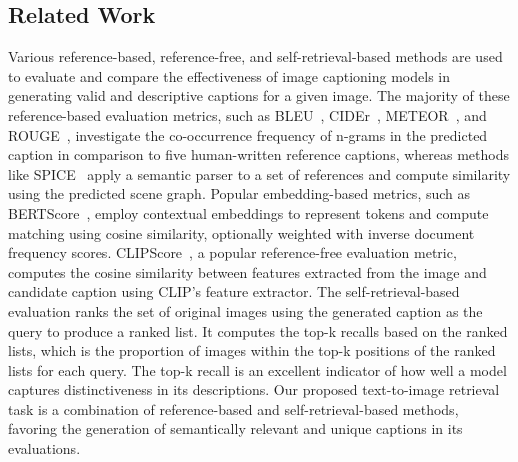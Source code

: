 \subsection{Related Work}
Various reference-based, reference-free, and self-retrieval-based methods are used to evaluate and compare the effectiveness of image captioning models in generating valid and descriptive captions for a given image. The majority of these reference-based evaluation metrics, such as BLEU~\cite{bleu}, CIDEr~\cite{CIDEr}, METEOR~\cite{METEOR}, and ROUGE~\cite{ROUGE}, investigate the co-occurrence frequency of n-grams in the predicted caption in comparison to five human-written reference captions, whereas methods like SPICE~\cite{Anderson2016SPICESP} apply a semantic parser to a set of references and compute similarity using the predicted scene graph. Popular embedding-based metrics, such as BERTScore~\cite{BERTScore}, employ contextual embeddings to represent tokens and compute matching using cosine similarity, optionally weighted with inverse document frequency scores. CLIPScore~\cite{CLIPScore}, a popular reference-free evaluation metric, computes the cosine similarity between features extracted from the image and candidate caption using CLIP's feature extractor. The self-retrieval-based evaluation ranks the set of original images using the generated caption as the query to produce a ranked list. It computes the top-k recalls based on the ranked lists, which is the proportion of images within the top-k positions of the ranked lists for each query. The top-k recall is an excellent indicator of how well a model captures distinctiveness in its descriptions. Our proposed text-to-image retrieval task is a combination of reference-based and self-retrieval-based methods, favoring the generation of semantically relevant and unique captions in its evaluations.
